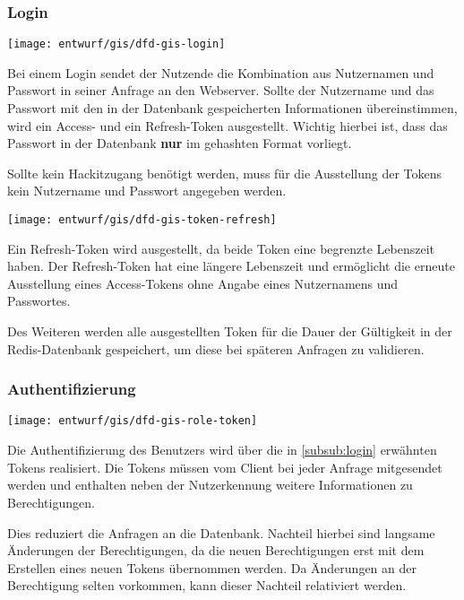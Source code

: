 \subsubsection{Login}\label{subsub:login}
\texttt{[image: entwurf/gis/dfd-gis-login]}

Bei einem Login sendet der Nutzende die Kombination aus Nutzernamen und Passwort in seiner Anfrage an den Webserver. Sollte der Nutzername und das Passwort mit den in der Datenbank gespeicherten Informationen übereinstimmen, wird ein Access- und ein Refresh-Token ausgestellt. Wichtig hierbei ist, dass das Passwort in der Datenbank \textbf{nur} im gehashten Format vorliegt.

Sollte kein Hackitzugang benötigt werden, muss für die Ausstellung der Tokens kein Nutzername und Passwort angegeben werden.

\texttt{[image: entwurf/gis/dfd-gis-token-refresh]}

Ein Refresh-Token wird ausgestellt, da beide Token eine begrenzte Lebenszeit haben. Der Refresh-Token hat eine längere Lebenszeit und ermöglicht die erneute Ausstellung eines Access-Tokens ohne Angabe eines Nutzernamens und Passwortes.

Des Weiteren werden alle ausgestellten Token für die Dauer der Gültigkeit in der Redis-Datenbank gespeichert, um diese bei späteren Anfragen zu validieren. 

\subsubsection{Authentifizierung}

\texttt{[image: entwurf/gis/dfd-gis-role-token]}

Die Authentifizierung des Benutzers wird über die in \autoref{subsub:login} erwähnten Tokens realisiert. Die Tokens müssen vom Client bei jeder Anfrage mitgesendet werden und enthalten neben der Nutzerkennung weitere Informationen zu Berechtigungen. 

Dies reduziert die Anfragen an die Datenbank. Nachteil hierbei sind langsame Änderungen der Berechtigungen, da die neuen Berechtigungen erst mit dem Erstellen eines neuen Tokens übernommen werden. Da Änderungen an der Berechtigung selten vorkommen, kann dieser Nachteil relativiert werden.

